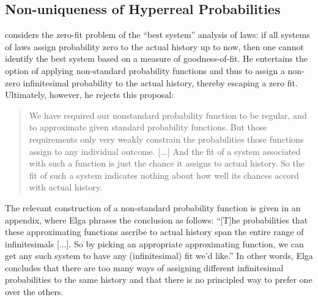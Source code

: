 \subsection{Non-uniqueness of Hyperreal Probabilities}
\citet{Elga:2004} considers the zero-fit problem of the ``best system'' analysis of laws: if all systems of laws assign probability zero to the actual history up to now, then one cannot identify the best system based on a measure of goodness-of-fit. He entertains the option of applying non-standard probability functions and thus to assign a non-zero infinitesimal probability to the actual history, thereby escaping a zero fit. Ultimately, however, he rejects this proposal:
\begin{quote}
We have required our nonstandard probability function to be regular, and to approximate given standard probability functions. But those requirements only very weakly constrain the probabilities those functions assign to any individual outcome. [...] And the fit of a system associated with such a function is just the chance it assigns to actual history. So the fit of such a system indicates nothing about how well its chances accord with actual history.
\end{quote}
The relevant construction of a non-standard probability function is given in an appendix, where Elga phrases the conclusion as follows:
``[T]he probabilities that these approximating functions ascribe to actual history span the entire range of infinitesimals [...]. So by picking an appropriate approximating function, we can get any such system to have any (infinitesimal) fit we'd like.''
In other words, Elga concludes that there are too many ways of assigning different infinitesimal probabilities to the same history and that there is no principled way to prefer one over the others.

